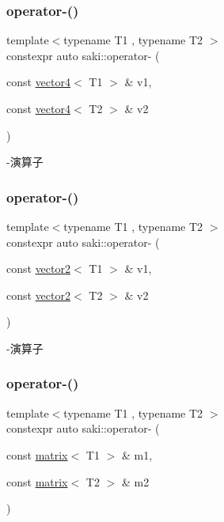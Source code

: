 \subsubsection{\texorpdfstring{operator-\/()}{operator-()}\hspace{0.1cm}{\footnotesize\ttfamily [3/5]}}
{\footnotesize\ttfamily template$<$typename T1 , typename T2 $>$ \\
constexpr auto saki\+::operator-\/ (\begin{DoxyParamCaption}\item[{const \mbox{\hyperlink{classsaki_1_1vector4}{vector4}}$<$ T1 $>$ \&}]{v1,  }\item[{const \mbox{\hyperlink{classsaki_1_1vector4}{vector4}}$<$ T2 $>$ \&}]{v2 }\end{DoxyParamCaption})}



-\/演算子 

\mbox{\label{namespacesaki_ab08546185e6a03ba6496daf21d943799}} 
\subsubsection{\texorpdfstring{operator-\/()}{operator-()}\hspace{0.1cm}{\footnotesize\ttfamily [4/5]}}
{\footnotesize\ttfamily template$<$typename T1 , typename T2 $>$ \\
constexpr auto saki\+::operator-\/ (\begin{DoxyParamCaption}\item[{const \mbox{\hyperlink{classsaki_1_1vector2}{vector2}}$<$ T1 $>$ \&}]{v1,  }\item[{const \mbox{\hyperlink{classsaki_1_1vector2}{vector2}}$<$ T2 $>$ \&}]{v2 }\end{DoxyParamCaption})}



-\/演算子 

\mbox{\label{namespacesaki_aa7474901f1f0d3a80142ed713b75ed5e}} 
\subsubsection{\texorpdfstring{operator-\/()}{operator-()}\hspace{0.1cm}{\footnotesize\ttfamily [5/5]}}
{\footnotesize\ttfamily template$<$typename T1 , typename T2 $>$ \\
constexpr auto saki\+::operator-\/ (\begin{DoxyParamCaption}\item[{const \mbox{\hyperlink{classsaki_1_1matrix}{matrix}}$<$ T1 $>$ \&}]{m1,  }\item[{const \mbox{\hyperlink{classsaki_1_1matrix}{matrix}}$<$ T2 $>$ \&}]{m2 }\end{DoxyParamCaption})}



